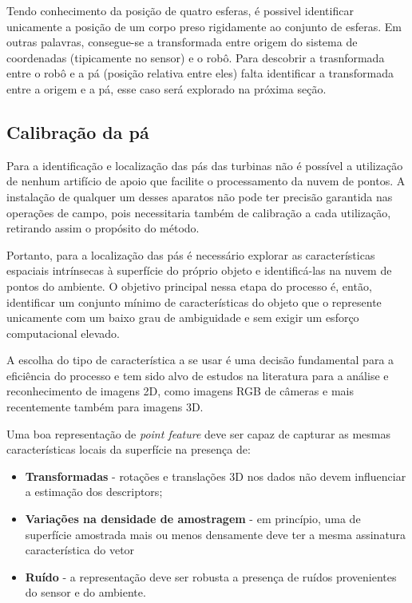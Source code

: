 Tendo conhecimento da posição de quatro esferas, é possivel identificar
unicamente a posição de um corpo preso rigidamente ao conjunto de esferas. Em outras palavras, consegue-se a
transformada entre origem do sistema de coordenadas (tipicamente no sensor) e o robô. Para descobrir a trasnformada entre o robô e a pá (posição relativa entre eles) falta identificar a
transformada entre a origem e a pá, esse caso será explorado na próxima seção.


\subsection{Calibração da pá}

Para a identificação e localização das pás das turbinas não é possível a
utilização de nenhum artifício de apoio que facilite o processamento da nuvem de
pontos. A instalação de qualquer um desses aparatos não pode ter precisão
garantida nas operações de campo, pois necessitaria também de calibração a
cada utilização, retirando assim o propósito do método. 

Portanto, para a localização das pás é
necessário explorar as características espaciais intrínsecas à superfície do
próprio objeto e identificá-las na nuvem de pontos do ambiente. O objetivo
principal nessa etapa do processo é, então, identificar um conjunto mínimo de
características do objeto que o represente unicamente com um baixo grau
de ambiguidade e sem exigir um esforço computacional elevado.

A escolha do tipo de característica a se usar é uma decisão fundamental para a
eficiência do processo e tem sido alvo de estudos na literatura para a análise
e reconhecimento de imagens 2D, como imagens RGB de câmeras e mais recentemente
também para imagens 3D. 

Uma boa representação de \textit{point feature} deve ser capaz de capturar as
mesmas características locais da superfície na presença de:

\begin{itemize}
  \item \textbf{Transformadas} -  rotações e translações 3D nos dados não devem
  influenciar a estimação dos descriptors;
  \item \textbf{Variações na densidade de amostragem} - em princípio, uma de
  superfície amostrada mais ou menos densamente deve ter a mesma assinatura característica do vetor
  \item \textbf{Ruído} - a representação deve ser robusta a presença de ruídos
  provenientes do sensor e do ambiente.
\end{itemize}

